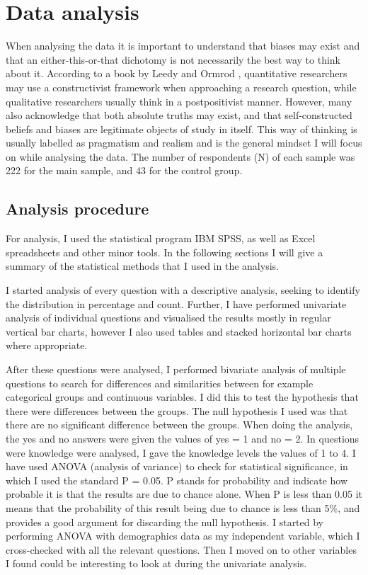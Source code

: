 \section{Data analysis}
When analysing the data it is important to understand that biases may exist and that an either-this-or-that dichotomy is not necessarily the best way to think about it. According to a book by Leedy and Ormrod \cite{pracres}, quantitative researchers may use a constructivist framework when approaching a research question, while qualitative researchers usually think in a postpositivist manner. However, many also acknowledge that both absolute truths may exist, and that self-constructed beliefs and biases are legitimate objects of study in itself. This way of thinking is usually labelled as pragmatism and realism and is the general mindset I will focus on while analysing the data. 
The number of respondents (N) of each sample was 222 for the main sample, and 43 for the control group. 

\subsection{Analysis procedure}
For analysis, I used the statistical program IBM SPSS, as well as Excel spreadsheets and other minor tools. In the following sections I will give a summary of the statistical methods that I used in the analysis. 

I started analysis of every question with a descriptive analysis, seeking to identify the distribution in percentage and count. Further, I have performed univariate analysis of individual questions and visualised the results mostly in regular vertical bar charts, however I also used tables and stacked horizontal bar charts where appropriate. 

After these questions were analysed, I performed bivariate analysis of multiple questions to search for differences and similarities between for example categorical groups and continuous variables. I did this to test the hypothesis that there were differences between the groups. The null hypothesis I used was that there are no significant difference between the groups. When doing the analysis, the yes and no answers were given the values of yes = 1 and no = 2. In questions were knowledge were analysed, I gave the knowledge levels the values of 1 to 4. I have used ANOVA (analysis of variance) to check for statistical significance, in which I used the standard P = 0.05. P stands for probability and indicate how probable it is that the results are due to chance alone. When P is less than 0.05 it means that the probability of this result being due to chance is less than 5\%, and provides a good argument for discarding the null hypothesis. I started by performing ANOVA with demographics data as my independent variable, which I cross-checked with all the relevant questions. Then I moved on to other variables I found could be interesting to look at during the univariate analysis. 

